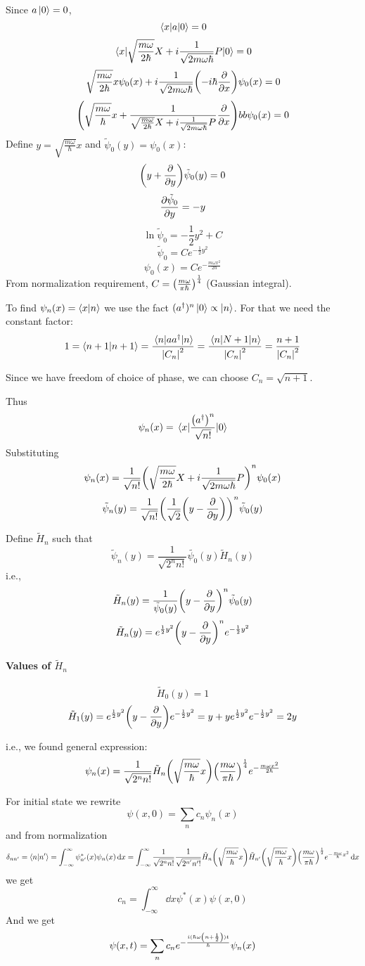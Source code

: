 Since $a\ket{0}=0$,
$$\mel{x}{a}{0} = 0$$
$$\mel{x}{\sqrt{\frac{m\omega}{2\hbar}} X +i\frac{1}{\sqrt{2m\omega\hbar}} P}{0} = 0$$
$$\sqrt{\frac{m\omega}{2\hbar}}x\psi_0(x) +i\frac{1}{\sqrt{2m\omega\hbar}} \qty(-i\hbar \pdv{x}) \psi_0(x)= 0$$
$$\qty(\sqrt{\frac{m\omega}{\hbar}} x + \frac{1}{\sqrt{\frac{m\omega}{2\hbar}} X +i\frac{1}{\sqrt{2m\omega\hbar}} P}\pdv{x})bb\psi_0(x) = 0$$
Define $y=\sqrt{\frac{m\omega}{\hbar}}x$ and $\tilde{\psi}_0(y) = \psi_0(x)$:
$$\qty(y+\pdv{y}) \tilde{\psi}_0(y) = 0$$
$$\pdv{\tilde{\psi}_0}{y} = -y$$
$$\ln \tilde{\psi}_0 = -\frac{1}{2} y^2 + C$$
$$\tilde{\psi}_0 = C e^{-\frac{1}{2} y^2 }$$
$$\psi_0(x)  = C e^{-\frac{m\omega x^2}{2\hbar}}$$
From normalization requirement, $C = \qty(\frac{m\omega}{\pi \hbar})^{\frac{1}{4}}$ (Gaussian integral).

To find $\psi_n(x) = \braket{x}{n}$ we use the fact $(a^\dagger)^n \ket{0} \propto \ket{n}$.
For that we need the constant  factor:
$$1 = \braket{n+1}{n+1} = \frac{\mel{n}{aa^\dagger}{n}}{\abs{C_n}^2} = \frac{\mel{n}{N+1}{n}}{\abs{C_n}^2} = \frac{n+1}{\abs{C_n}^2}  $$

Since we have freedom of choice of phase, we can choose $C_n = \sqrt{n+1}$.

Thus
$$\psi_n(x) = \mel{x}{\frac{\qty(a^\dagger)^n}{\sqrt{n!}}}{0}$$
Substituting
$$\psi_n(x) =\frac{1}{\sqrt{n!}}\qty(\sqrt{\frac{m\omega}{2\hbar}} X +i\frac{1}{\sqrt{2m\omega\hbar}} P)^n \psi_0(x)$$
$$\tilde{\psi}_n(y) = \frac{1}{\sqrt{n!}} \qty(\frac{1}{\sqrt{2}}\qty(y-\pdv{y}))^n \tilde{\psi}_0(y)$$

Define $\tilde{H}_n$ such that
$$\tilde{\psi}_n(y) = \frac{1}{\sqrt{2^nn!}} \tilde{\psi_0}(y) \tilde{H}_n(y)$$
i.e.,
$$\tilde{H}_n(y) = \frac{1}{\tilde{\psi}_0(y)} \qty(y-\pdv{y})^n\tilde{\psi}_0(y)$$
$$\tilde{H}_n(y) = e^{\frac{1}{2}y^2} \qty(y-\pdv{y})^n  e^{-\frac{1}{2}y^2} $$

\paragraph{Values of $\tilde{H}_n$}
$$\tilde{H}_0(y) = 1$$
$$\tilde{H}_1(y) = e^{\frac{1}{2}y^2} \qty(y-\pdv{y})  e^{-\frac{1}{2}y^2} = y + y e^{\frac{1}{2}y^2}e^{-\frac{1}{2}y^2} = 2y $$

i.e., we found general expression:
$$\psi_n(x) = \frac{1}{\sqrt{2^nn!}} \tilde{H}_n\qty(\sqrt{\frac{m\omega}{\hbar}}x)\qty(\frac{m\omega}{\pi \hbar})^{\frac{1}{4}}e^{-\frac{m\omega x^2}{2\hbar}}$$

For initial state we rewrite
$$\psi(x,0) = \sum_n c_n \psi_n(x)$$
and from normalization
$$\delta_{nn'} = \braket{n}{n'} = \int_{-\infty}^\infty \psi^*_{n'}(x) \psi_n(x) \dd{x} = \int_{-\infty}^\infty \frac{1}{\sqrt{2^nn!}} \frac{1}{\sqrt{2^{n'}n'!}} \tilde{H}_n\qty(\sqrt{\frac{m\omega}{\hbar}}x) \tilde{H}_{n'}\qty(\sqrt{\frac{m\omega}{\hbar}}x) \qty(\frac{m\omega}{\pi \hbar})^{\frac{1}{2}} e^{-\frac{m\omega}{\hbar}x^2}\dd{x}$$
we get
$$c_n = \int_{-\infty}^\infty \dd{x} \psi^*(x) \psi(x,0)  $$
And we get
$$\psi(x,t) = \sum_n c_n e^{-\frac{i(\hbar \omega \qty(n+\frac{1}{2}))t}{\hbar}} \psi_n(x)$$